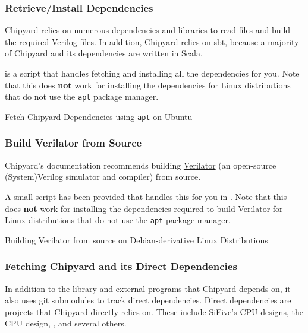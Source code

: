 \subsubsection{Retrieve/Install Dependencies}\label{sec:Retrive_Install_Dependencies}
Chipyard relies on numerous dependencies and libraries to read files and build the required Verilog files.
In addition, Chipyard relies on \gls{sbt}, because a majority of Chipyard and its dependencies are written in Scala.

 is a script that handles fetching and installing all the dependencies for you.
Note that this does \textbf{not} work for installing the dependencies for Linux distributions that do not use the \texttt{apt} package manager.

\begin{listing}[h!tbp]
\caption{Fetch Chipyard Dependencies using \texttt{apt} on Ubuntu}
\label{lst:Ubuntu_Chipyard_Deps_Setup}
\end{listing}

\subsubsection{Build Verilator from Source}\label{sec:Build_Verilator_from_Source}
Chipyard's documentation recommends building \href{https://www.veripool.org/wiki/verilator}{Verilator} (an open-source (System)Verilog simulator and compiler) from \gls{source}.

A small script has been provided that handles this for you in .
Note that this does \textbf{not} work for installing the dependencies required to build Verilator for Linux distributions that do not use the \texttt{apt} package manager.

\begin{listing}[h!tbp]
\caption{Building Verilator from \Gls{source} on Debian-derivative Linux Distributions}
\label{lst:Build_Verilator_from_Source}
\end{listing}

\subsubsection{Fetching Chipyard and its Direct Dependencies}\label{sec:Fetching_Chipyard_Direct_Dependencies}
In addition to the library and external programs that Chipyard depends on, it also uses git submodules to track direct dependencies.
Direct dependencies are projects that Chipyard directly relies on.
These include SiFive's CPU designs, the  CPU design, , and several others.

